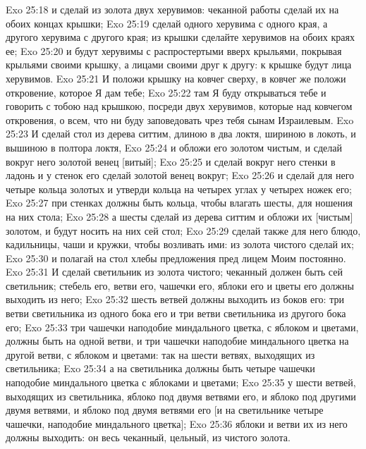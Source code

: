 \vs Exo 25:18 и сделай из золота двух херувимов: чеканной работы сделай их на обоих концах крышки;
\vs Exo 25:19 сделай одного херувима с одного края, а другого херувима с другого края;  из крышки сделайте херувимов на обоих краях ее;
\vs Exo 25:20 и будут херувимы с распростертыми вверх крыльями, покрывая крыльями своими крышку, а лицами своими  друг к другу: к крышке будут лица херувимов.
\vs Exo 25:21 И положи крышку на ковчег сверху, в ковчег же положи откровение, которое Я дам тебе;
\vs Exo 25:22 там Я буду открываться тебе и говорить с тобою над крышкою, посреди двух херувимов, которые над ковчегом откровения, о всем, что ни буду заповедовать чрез тебя сынам Израилевым.
\rsbpar\vs Exo 25:23 И сделай стол из дерева ситтим, длиною в два локтя, шириною в локоть, и вышиною в полтора локтя,
\vs Exo 25:24 и обложи его золотом чистым, и сделай вокруг него золотой венец [витый];
\vs Exo 25:25 и сделай вокруг него стенки в ладонь и у стенок его сделай золотой венец вокруг;
\vs Exo 25:26 и сделай для него четыре кольца золотых и утверди кольца на четырех углах у четырех ножек его;
\vs Exo 25:27 при стенках должны быть кольца, чтобы влагать шесты, для ношения на них стола;
\vs Exo 25:28 а шесты сделай из дерева ситтим и обложи их [чистым] золотом, и будут носить на них сей стол;
\vs Exo 25:29 сделай также для него блюдо, кадильницы, чаши и кружки, чтобы возливать ими: из золота чистого сделай их;
\vs Exo 25:30 и полагай на стол хлебы предложения пред лицем Моим постоянно.
\rsbpar\vs Exo 25:31 И сделай светильник из золота чистого; чеканный должен быть сей светильник; стебель его, ветви его, чашечки его, яблоки его и цветы его должны выходить из него;
\vs Exo 25:32 шесть ветвей должны выходить из боков его: три ветви светильника из одного бока его и три ветви светильника из другого бока его;
\vs Exo 25:33 три чашечки наподобие миндального цветка, с яблоком и цветами, должны быть на одной ветви, и три чашечки наподобие миндального цветка на другой ветви, с яблоком и цветами: так на  шести ветвях, выходящих из светильника;
\vs Exo 25:34 а на  светильника должны быть четыре чашечки наподобие миндального цветка с яблоками и цветами;
\vs Exo 25:35 у шести ветвей, выходящих из  светильника, яблоко под двумя ветвями его, и яблоко под другими двумя ветвями, и яблоко под  двумя ветвями его [и на светильнике четыре чашечки, наподобие миндального цветка];
\vs Exo 25:36 яблоки и ветви их из него должны выходить: он весь  чеканный, цельный, из чистого золота.
